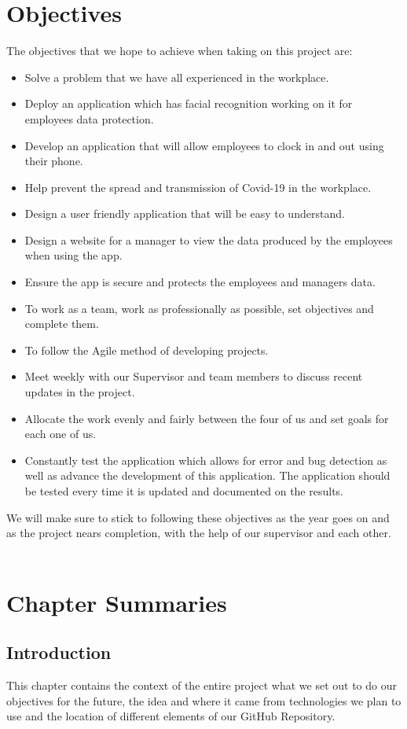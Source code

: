 \section{Objectives}
The objectives that we hope to achieve when taking on this project are:
\begin{itemize}
    \item Solve a problem that we have all experienced in the workplace.
    \item Deploy an application which has facial recognition working on it for employees data protection.
    \item Develop an application that will allow employees to clock in and out using their phone.
    \item Help prevent the spread and transmission of Covid-19 in the workplace.
    \item Design a user friendly application that will be easy to understand.
    \item Design a website for a manager to view the data produced by the employees when using the app.
    \item Ensure the app is secure and protects the employees and managers data.
    \item To work as a team, work as professionally as possible, set objectives and complete them.
    \item To follow the Agile method of developing projects.
    \item Meet weekly with our Supervisor and team members to discuss recent updates in the project.
    \item Allocate the work evenly and fairly between the four of us and set goals for each one of us.
    \item Constantly test the application which allows for error and bug detection as well as advance the development of this application. The application should be tested every time it is updated and documented on the results.
\end{itemize}
We will make sure to stick to following these objectives as the year goes on and as the project nears completion, with the help of our supervisor and each other.
\\
\\

\section{Chapter Summaries}
\subsection{Introduction}
This chapter contains the context of the entire project what we set out to do our objectives
for the future, the idea and where it came from technologies we plan to use and the location
of different elements of our GitHub Repository.
\\

